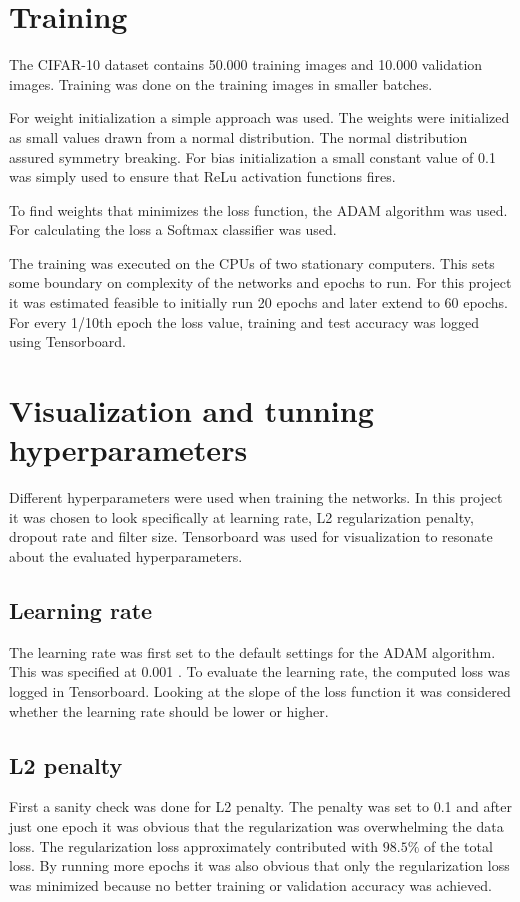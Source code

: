 \section{Training}
The CIFAR-10 dataset contains 50.000 training images and 10.000 validation images. Training was done on the training images in smaller batches. 

For weight initialization a simple approach was used. The weights were initialized as small values drawn from a normal distribution. The normal distribution assured symmetry breaking. For bias initialization a small constant value of 0.1 was simply used to ensure that ReLu activation functions fires.

To find weights that minimizes the loss function, the ADAM algorithm was used. For calculating the loss a Softmax classifier was used.

The training was executed on the CPUs of two stationary computers. This sets some boundary on complexity of the networks and epochs to run. For this project it was estimated feasible to initially run 20 epochs and later extend to 60 epochs. For every 1/10th epoch the loss value, training and test accuracy was logged using Tensorboard.

\section{Visualization and tunning hyperparameters}
Different hyperparameters were used when training the networks. In this project it was chosen to look specifically at learning rate, L2 regularization penalty, dropout rate and filter size. Tensorboard was used for visualization to resonate about the evaluated hyperparameters.

\subsection{Learning rate}
The learning rate was first set to the default settings for the ADAM algorithm. This was specified at 0.001 \citep{ADAM}. To evaluate the learning rate, the computed loss was logged in Tensorboard. Looking at the slope of the loss function it was considered whether the learning rate should be lower or higher.


\subsection{L2 penalty}
First a sanity check was done for L2 penalty. The penalty was set to 0.1 and after just one epoch it was obvious that the regularization was overwhelming the data loss. The regularization loss approximately contributed with $98.5\%$ of the total loss. By running more epochs it was also obvious that only the regularization loss was minimized because no better training or validation accuracy was achieved.

